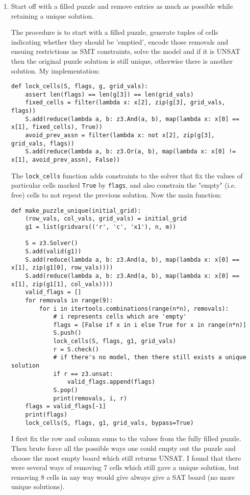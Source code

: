 \begin{enumerate}[label=(\alph*)]
  \item {\color{blue}Start off with a filled puzzle and remove entries as much as possible while retaining a unique solution.}

    The procedure is to start with a filled puzzle, generate tuples of cells indicating whether they should be 'emptied', encode those removals and ensuing restrictions as SMT constraints, solve the model and if it is UNSAT then the original puzzle solution is still unique, otherwise there is another solution. My implementation:

    \begin{verbatim}
def lock_cells(S, flags, g, grid_vals):
    assert len(flags) == len(g[3]) == len(grid_vals)
    fixed_cells = filter(lambda x: x[2], zip(g[3], grid_vals, flags))
    S.add(reduce(lambda a, b: z3.And(a, b), map(lambda x: x[0] == x[1], fixed_cells), True))
    avoid_prev_assn = filter(lambda x: not x[2], zip(g[3], grid_vals, flags))
    S.add(reduce(lambda a, b: z3.Or(a, b), map(lambda x: x[0] != x[1], avoid_prev_assn), False))
    \end{verbatim}

    The \texttt{lock\_cells} function adds constraints to the solver that fix the values of particular cells marked \texttt{True} by \texttt{flags}, and also constrain the "empty" (i.e. free) cells to not repeat the previous solution. Now the main function:

    \begin{verbatim}
def make_puzzle_unique(initial_grid):
    (row_vals, col_vals, grid_vals) = initial_grid
    g1 = list(gridvars(('r', 'c', 'x1'), n, m))

    S = z3.Solver()
    S.add(valid(g1))
    S.add(reduce(lambda a, b: z3.And(a, b), map(lambda x: x[0] == x[1], zip(g1[0], row_vals))))
    S.add(reduce(lambda a, b: z3.And(a, b), map(lambda x: x[0] == x[1], zip(g1[1], col_vals))))
    valid_flags = []
    for removals in range(9):
        for i in itertools.combinations(range(n*n), removals):
            # i represents cells which are 'empty'
            flags = [False if x in i else True for x in range(n*n)]
            S.push()
            lock_cells(S, flags, g1, grid_vals)
            r = S.check()
            # if there's no model, then there still exists a unique solution
            if r == z3.unsat:
                valid_flags.append(flags)
            S.pop()
            print(removals, i, r)
    flags = valid_flags[-1]
    print(flags)
    lock_cells(S, flags, g1, grid_vals, bypass=True)
    \end{verbatim}

    I first fix the row and column sums to the values from the fully filled puzzle. Then brute force all the possible ways one could empty out the puzzle and choose the most empty board which still returns UNSAT. I found that there were several ways of removing 7 cells which still gave a unique solution, but removing 8 cells in any way would give always give a SAT board (no more unique solutions).
\end{enumerate}


